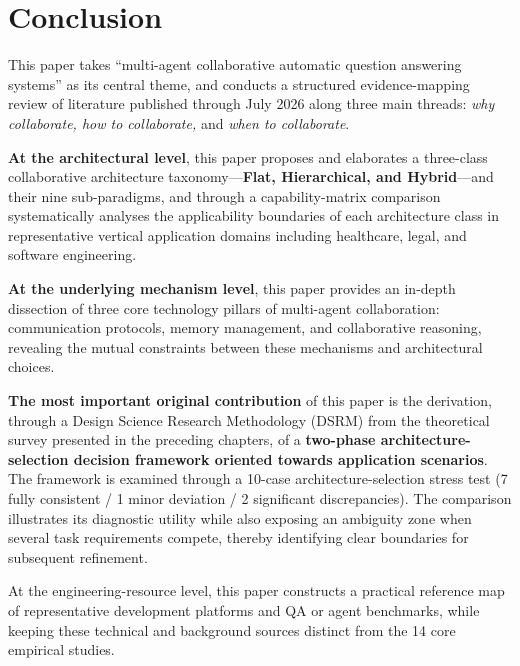\section{Conclusion}
\label{sec:conclusion}

This paper takes ``multi-agent collaborative automatic question answering
systems'' as its central theme, and conducts a structured evidence-mapping
review of literature published through July 2026 along
three main threads: \emph{why collaborate, how to collaborate,} and
\emph{when to collaborate}.

\textbf{At the architectural level}, this paper proposes and elaborates a
three-class collaborative architecture taxonomy---\textbf{Flat,
Hierarchical, and Hybrid}---and their nine sub-paradigms, and through a
capability-matrix comparison systematically analyses the applicability
boundaries of each architecture class in representative vertical application
domains including healthcare, legal, and software engineering.

\textbf{At the underlying mechanism level}, this paper provides an in-depth
dissection of three core technology pillars of multi-agent collaboration:
communication protocols, memory management, and collaborative reasoning,
revealing the mutual constraints between these mechanisms and architectural
choices.

\textbf{The most important original contribution} of this paper is the
derivation, through a Design Science Research Methodology (DSRM)
\citep{peffers2007dsrm} from the theoretical survey presented in the
preceding chapters, of a \textbf{two-phase architecture-selection decision
framework oriented towards application scenarios}.
The framework is examined through a 10-case architecture-selection stress
test (7 fully consistent / 1 minor deviation / 2 significant discrepancies).
The comparison illustrates its diagnostic utility while also exposing an
ambiguity zone when several task requirements compete, thereby identifying
clear boundaries for subsequent refinement.

At the engineering-resource level, this paper constructs a practical
reference map of representative development platforms and QA or agent
benchmarks, while keeping these technical and background sources distinct
from the 14 core empirical studies.

